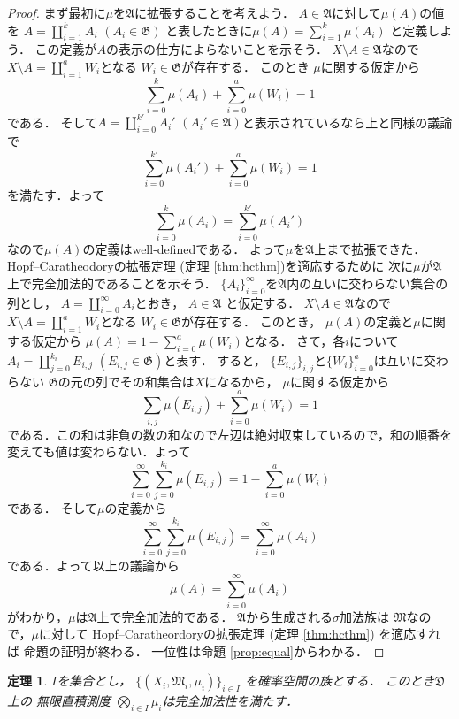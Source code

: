 \documentclass[leqno, a4paper, 12pt]{jsarticle}
\newtheorem{thm}{定理}
\begin{document}
\begin{proof}
まず最初に$\mu$を$\mathfrak{A}$に拡張することを考えよう．
$A\in \mathfrak{A}$に対して$\mu(A)$の値を
$A=\coprod_{i=1}^{k}A_{i}$ $(A_{i}\in \mathfrak{G})$
と表したときに$\mu(A)=\sum_{i=1}^{k}\mu(A_{i})$
と定義しよう．
この定義が$A$の表示の仕方によらないことを示そう．
$X\setminus A\in \mathfrak{A}$なので
$X\setminus A=\coprod_{i=1}^{a}W_{i}$となる
$W_{i}\in \mathfrak{G}$が存在する．
このとき
$\mu$に関する仮定から
\[
\sum_{i=0}^{k}\mu(A_{i})+\sum_{i=0}^{a}\mu(W_{i})=1
\]
である．
そして$A=\coprod_{i=0}^{k'}A_{i}'$ $(A_{i}'\in \mathfrak{A})$と表示されているなら上と同様の議論で
\[
\sum_{i=0}^{k'}\mu(A_{i}')+\sum_{i=0}^{a}\mu(W_{i})=1
\]
を満たす．よって
\[
\sum_{i=0}^{k}\mu(A_{i})
=
\sum_{i=0}^{k'}\mu(A_{i}')
\]
なので$\mu(A)$の定義はwell-definedである．
よって$\mu$を$\mathfrak{A}$上まで拡張できた．
Hopf--Caratheodoryの拡張定理 (定理 \ref{thm:hcthm})を適応するために
次に$\mu$が$\mathfrak{A}$上で完全加法的であることを示そう．
$\{A_{i}\}_{i=0}^{\infty}$を$\mathfrak{A}$内の互いに交わらない集合の列とし，
$A=\coprod_{i=0}^{\infty}A_{i}$とおき，
$A\in \mathfrak{A}$
と仮定する．
$X\setminus A\in \mathfrak{A}$なので
$X\setminus A=\coprod_{i=1}^{a}W_{i}$となる
$W_{i}\in \mathfrak{G}$が存在する．
このとき，
$\mu(A)$の定義と$\mu$に関する仮定から
$\mu(A)=1-\sum_{i=0}^{a}\mu(W_{i})$となる．
さて，各$i$について$A_{i}=\coprod_{j=0}^{k_{i}}E_{i, j}$ 
$(E_{i, j}\in \mathfrak{G})$と表す．
すると，
$\{E_{i, j}\}_{i, j}$と$\{W_{i}\}_{i=0}^{a}$は互いに交わらない
$\mathfrak{G}$の元の列でその和集合は$X$になるから，
$\mu$に関する仮定から
\[
\sum_{i, j}\mu(E_{i, j})+
\sum_{i=0}^{a}\mu(W_{i})=1
\]
である．この和は非負の数の和なので左辺は絶対収束しているので，和の順番を変えても値は変わらない．よって
\[
\sum_{i=0}^{\infty}\sum_{j=0}^{k_{i}}\mu(E_{i, j})=
1-
\sum_{i=0}^{a}\mu(W_{i})
\]
である．
そして$\mu$の定義から
\[
\sum_{i=0}^{\infty}\sum_{j=0}^{k_{i}}\mu(E_{i, j})=
\sum_{i=0}^{\infty}\mu(A_{i})
\]
である．よって以上の議論から
\[
\mu(A)=\sum_{i=0}^{\infty}\mu(A_{i})
\]
がわかり，$\mu$は$\mathfrak{A}$上で完全加法的である．
$\mathfrak{A}$から生成される$\sigma$加法族は
$\mathfrak{M}$なので，$\mu$に対して
Hopf--Caratheordoryの拡張定理 (定理 \ref{thm:hcthm})
を適応すれば
命題の証明が終わる．
一位性は命題 \ref{prop:equal}からわかる．
\end{proof} 

\begin{thm}\label{thm:delta}
$I$を集合とし，
$\{(X_{i}, \mathfrak{M}_{i}, \mu_{i})\}_{i\in I}$
を確率空間の族とする．
このとき$\mathfrak{D}$上の
無限直積測度
$\bigotimes_{i\in I}\mu_{i}$は完全加法性を満たす．
\end{thm}
\end{document}
